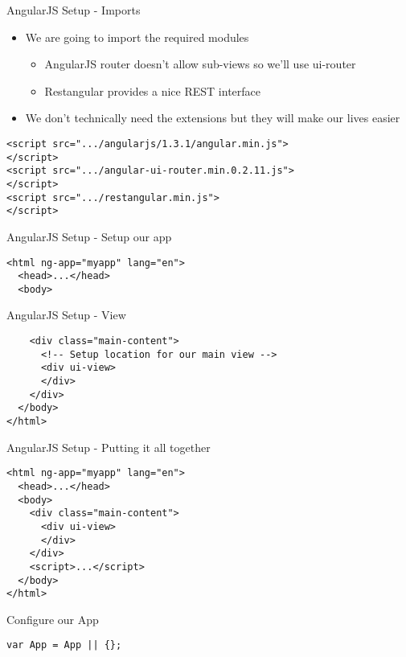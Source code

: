\documentclass[presentation]{beamer}
\begin{document}
\begin{frame}[fragile,label=sec-2-1]{AngularJS Setup - Imports}
 \begin{itemize}
\item We are going to import the required modules
\begin{itemize}
\item AngularJS router doesn't allow sub-views so we'll use ui-router
\item Restangular provides a nice REST interface
\end{itemize}
\item We don't technically need the extensions but they will make our lives easier
\end{itemize}
\begin{verbatim}
<script src=".../angularjs/1.3.1/angular.min.js">
</script>
<script src=".../angular-ui-router.min.0.2.11.js">
</script>
<script src=".../restangular.min.js">
</script>
\end{verbatim}

\begin{frame}[fragile,label=sec-2-2]{AngularJS Setup - Setup our app}
 \begin{verbatim}
<html ng-app="myapp" lang="en">
  <head>...</head>
  <body>
\end{verbatim}
\end{frame}

\begin{frame}[fragile,label=sec-2-3]{AngularJS Setup - View}
 \begin{verbatim}
    <div class="main-content">
      <!-- Setup location for our main view -->
      <div ui-view>
      </div>
    </div>
  </body>
</html>
\end{verbatim}
\end{frame}

\begin{frame}[fragile,label=sec-2-4]{AngularJS Setup - Putting it all together}
 \begin{verbatim}
<html ng-app="myapp" lang="en">
  <head>...</head>
  <body>
    <div class="main-content">
      <div ui-view>
      </div>
    </div>
    <script>...</script>
  </body>
</html>
\end{verbatim}
\end{frame}

\begin{frame}[fragile,label=sec-2-5]{Configure our App}
 \begin{verbatim}
var App = App || {};


\end{verbatim}
\end{frame}
\end{frame}
\end{document}
